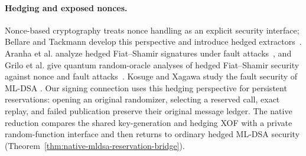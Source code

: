 \paragraph{Hedging and exposed nonces.}
Nonce-based cryptography treats nonce handling as an explicit security
interface; Bellare and Tackmann develop this perspective and introduce
hedged extractors~\cite{bellare2016nonce}. Aranha et al. analyze hedged
Fiat--Shamir signatures under fault attacks~\cite{aranha2020hedged}, and
Grilo et al. give quantum random-oracle analyses of hedged Fiat--Shamir
security against nonce and fault attacks~\cite{grilo2021reprogramming}.
Kosuge and Xagawa study the fault security of ML-DSA
\cite{kosuge2025mldsa}. Our signing connection uses this hedging perspective
for persistent reservations: opening an original randomizer, selecting a
reserved call, exact replay, and failed publication preserve their original
message ledger. The native reduction compares the shared key-generation
and hedging XOF with a private random-function interface and then returns
to ordinary hedged ML-DSA security
(Theorem~\ref{thm:native-mldsa-reservation-bridge}).
